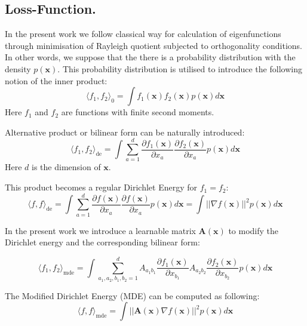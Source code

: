 \documentclass{article}
\theoremstyle{plain}
\theoremstyle{definition}
\theoremstyle{remark}
\begin{document}
\subsection{Loss-Function.}
\label{subseq:loss_function}
In the present work we follow classical way for calculation of eigenfunctions
through minimisation of Rayleigh quotient subjected to orthogonality conditions.
In other words, we suppose that the there is a probability distribution with the density $p(\mathbf{x})$.
This probability distribution is utilised to introduce the following notion of the inner product:
\begin{equation}
    \label{eq:bilinear_form_0}
    \langle f_1, f_2 \rangle_0 = \int f_1(\mathbf{x}) f_2(\mathbf{x}) p(\mathbf{x}) d\mathbf{x}
\end{equation}
Here $f_1$ and $f_2$ are functions with finite second moments.

Alternative product or bilinear form can be naturally introduced:
\begin{equation}
    \label{eq:bilinear_form_1_original}
    \langle f_1, f_2 \rangle_{\text{de}} = \int \sum_{a=1}^{d} \frac{\partial f_1(\mathbf{x})}{\partial x_a} \frac{\partial f_2(\mathbf{x})}{\partial x_a} p(\mathbf{x}) d\mathbf{x} 
\end{equation}
Here $d$ is the dimension of $\mathbf{x}$.


This product becomes a regular Dirichlet Energy for $f_1 = f_2$:
\begin{equation}
    \label{eq:dirichlet_energy_original}
    \langle f, f \rangle_{\text{de}} = \int \sum_{a=1}^{d} \frac{\partial f(\mathbf{x})}{\partial x_a} \frac{\partial f(\mathbf{x})}{\partial x_a} p(\mathbf{x}) d\mathbf{x} = \int ||\nabla f(\mathbf{x})||^2 p(\mathbf{x}) d\mathbf{x}
\end{equation}

In the present work we introduce a learnable matrix $\mathbf{A}(\mathbf{x})$ to modify the Dirichlet energy and the corresponding
bilinear form:

\begin{equation}
    \label{eq:bilinear_form_1}
    \langle f_1, f_2 \rangle_{\text{mde}} = \int \sum_{a_1, a_2, b_1, b_2=1}^{d} A_{a_1 b_1}\frac{\partial f_1(\mathbf{x})}{\partial x_{b_1}} A_{a_2 b_2} \frac{\partial f_2(\mathbf{x})}{\partial x_{b_2}} p(\mathbf{x}) d\mathbf{x} 
\end{equation}

The Modified Dirichlet Energy (MDE) can be computed as following:
\begin{equation}
    \label{eq:dirichlet_energy}
    \langle f, f \rangle_{\text{mde}} = \int ||\mathbf{A}(\mathbf{x})\nabla f(\mathbf{x})||^2 p(\mathbf{x}) d\mathbf{x}
\end{equation}
\end{document}
